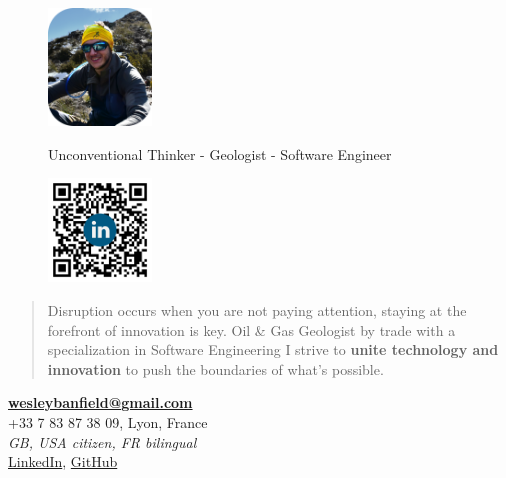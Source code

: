 \documentclass[]{friggeri-cv}
\begin{document}
\begin{figure}[!h]
	\begin{minipage}{0.48\textwidth}
		\begin{flushleft}
			\includegraphics[width=2.75cm]{img/profile_relaxed.png}
		\end{flushleft}
	\end{minipage}\hfill
 	{Unconventional Thinker - Geologist - Software Engineer}
	\begin{minipage}{0.48\textwidth}
		\begin{flushright}
			\includegraphics[width=2.75cm]{img/QR.png}
		\end{flushright}
	\end{minipage}
\end{figure}
\vspace{-0.75cm}

\begin{quote}
\large
Disruption occurs when you are not paying attention, staying at the forefront of innovation is key. Oil \& Gas Geologist by trade with a specialization in Software Engineering I strive to \textbf{unite technology and innovation} to push the boundaries of what’s possible.
\end{quote}

\begin{center}
\vspace{6pt}
\href{mailto:wesleybanfield@gmail.com}{\textbf{wesleybanfield@gmail.com}}
\\+33 7 83 87 38 09, Lyon, France
\\\emph{GB, USA citizen, FR bilingual}
\vspace{3pt}
\\\href{https://www.linkedin.com/in/wesleybanfield/}{LinkedIn},
\href{https://github.com/WesleyTheGeolien}{GitHub}
\end{center}
\end{document}
